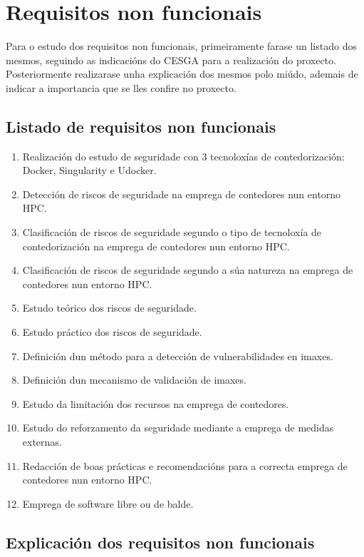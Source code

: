 \section{Requisitos non funcionais}

Para o estudo dos requisitos non funcionais, primeiramente farase un listado dos mesmos, seguindo as indicacións do \gls{CESGA} para a realización do proxecto. Posteriormente realizarase unha explicación dos mesmos polo miúdo, ademais de indicar a importancia que se lles confire no proxecto.

\subsection{Listado de requisitos non funcionais}

\begin{enumerate}[{RNF}1: ]
    \item Realización do estudo de seguridade con 3 tecnoloxías de contedorización: Docker, Singularity e Udocker.
    \item Detección de riscos de seguridade na emprega de contedores nun entorno \gls{HPC}.
    \item Clasificación de riscos de seguridade segundo o tipo de tecnoloxía de contedorización na emprega de contedores nun entorno \gls{HPC}.
    \item Clasificación de riscos de seguridade segundo a súa natureza na emprega de contedores nun entorno \gls{HPC}.
    \item Estudo teórico dos riscos de seguridade.
    \item Estudo práctico dos riscos de seguridade.
    \item Definición dun método para a detección de vulnerabilidades en imaxes.
    \item Definición dun mecanismo de validación de imaxes.
    \item Estudo da limitación dos recursos na emprega de contedores.
    \item Estudo do reforzamento da seguridade mediante a emprega de medidas externas.
    \item Redacción de boas prácticas e recomendacións para a correcta emprega de contedores nun entorno \gls{HPC}.
    \item Emprega de software libre ou de balde.
\end{enumerate}

\subsection{Explicación dos requisitos non funcionais}

